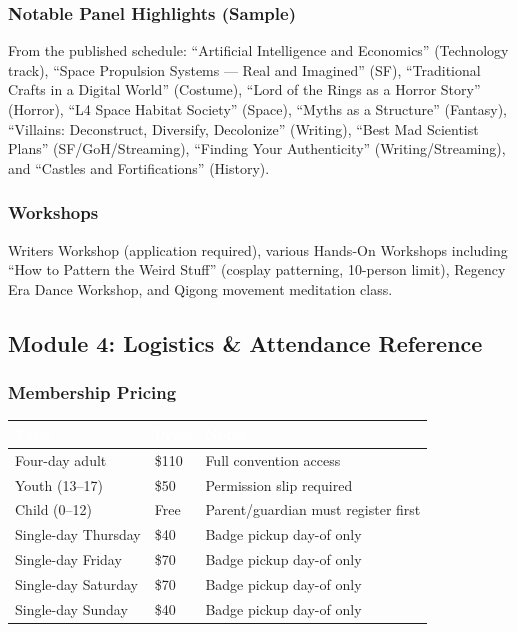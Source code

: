 \documentclass[11pt,letterpaper]{article}
\newcommand{\tableheader}[1]{\textbf{\sffamily\textcolor{white}{#1}}}
\begin{document}
\subsubsection{Notable Panel Highlights (Sample)}

From the published schedule: ``Artificial Intelligence and Economics'' (Technology track), ``Space Propulsion Systems --- Real and Imagined'' (SF), ``Traditional Crafts in a Digital World'' (Costume), ``Lord of the Rings as a Horror Story'' (Horror), ``L4 Space Habitat Society'' (Space), ``Myths as a Structure'' (Fantasy), ``Villains: Deconstruct, Diversify, Decolonize'' (Writing), ``Best Mad Scientist Plans'' (SF/GoH/Streaming), ``Finding Your Authenticity'' (Writing/Streaming), and ``Castles and Fortifications'' (History).

\subsubsection{Workshops}

Writers Workshop (application required), various Hands-On Workshops including ``How to Pattern the Weird Stuff'' (cosplay patterning, 10-person limit), Regency Era Dance Workshop, and Qigong movement meditation class.

\subsection{Module 4: Logistics \& Attendance Reference}

\subsubsection{Membership Pricing}

\begin{center}
\begin{tabularx}{\textwidth}{L{5cm}C{3cm}X}
\toprule
{}
\tableheader{Type} & \tableheader{Price} & \tableheader{Notes} \\
\midrule
Four-day adult & \$110 & Full convention access \\
Youth (13--17) & \$50 & Permission slip required \\
Child (0--12) & Free & Parent/guardian must register first \\
Single-day Thursday & \$40 & Badge pickup day-of only \\
Single-day Friday & \$70 & Badge pickup day-of only \\
Single-day Saturday & \$70 & Badge pickup day-of only \\
Single-day Sunday & \$40 & Badge pickup day-of only \\
\bottomrule
\end{tabularx}
\end{center}
\end{document}
